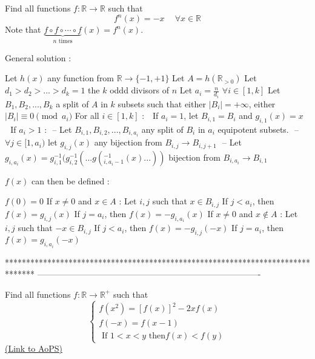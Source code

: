 \begin{solution}
	\begin{tcolorbox}Find all functions $f: \mathbb R \to\mathbb R$ such that \[f ^ {n} (x) =-x \quad\ \forall x\in\mathbb R\]
Note that $ \underbrace{f{\circ}f{\circ}\cdots{\circ}f}_{n \textrm{ times}}(x)=f^{n}(x) $.\end{tcolorbox}
General solution :

Let $h(x)$ any function from $\mathbb R\to\{-1,+1\}$
Let $A=h(\mathbb R_{>0})$
Let $d_1>d_2>... >d_k=1$ the $k$ oddd divisors of $n$
Let $a_i=\frac n{d_i}$ $\forall i\in[1,k]$
Let $B_1,B_2,...,B_k$ a split of $A$ in $k$ subsets such that either $|B_i|=+\infty$, either $|B_i|\equiv 0\pmod{a_i}$
For all $i\in[1,k]$ :
$\text{  }$If $a_i=1$, let $B_{i,1}=B_i$ and $g_{i,1}(x)=x$
$\text{  }$If $a_i>1$ :
$\text{     -- }$Let $B_{i,1},B_{i,2}, ...,B_{i,a_i}$ any split of $B_i$ in $a_i$ equipotent subsets.
$\text{     -- }$$\forall j\in[1,a_i)$ let $g_{i,j}(x)$ any bijection from $B_{i,j}\to B_{i,j+1}$
$\text{     -- }$Let $g_{i,a_i}(x)=g_{i,1}^{-1}(g_{i,2}^{-1}( ... g(_{i,a_i-1}^{-1}(x)...))$ bijection from $B_{i,a_i}\to B_{i,1}$

$f(x)$ can then be defined :

$f(0)=0$
If $x\ne 0$ and $x\in A$ : 
Let $i,j$ such that $x\in B_{i,j}$
If $j<a_i$, then $f(x)=g_{i,j}(x)$
If $j=a_i$, then $f(x)=-g_{i,a_i}(x)$
If $x\ne 0$ and $x\notin A$ :
Let $i,j$ such that $-x\in B_{i,j}$
If $j<a_i$, then $f(x)=-g_{i,j}(-x)$
If $j=a_i$, then $f(x)=g_{i,a_i}(-x)$
\end{solution}
*******************************************************************************
-------------------------------------------------------------------------------

\begin{problem}
	Find all functions $f:\mathbb{R} \to \mathbb{R^+}$ such that \[\begin{cases} f(x^2)=[f(x)]^2-2xf(x) \\ f(-x) = f(x-1) \\ \text{ If } 1<x<y \text{ then} f(x)<f(y) \end{cases}\]
	\flushright \href{https://artofproblemsolving.com/community/c6h565947}{(Link to AoPS)}
\end{problem}



